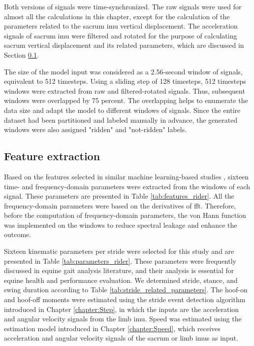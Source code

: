  Both versions of signals were time-synchronized. The raw signals were used for almost all the calculations in this chapter, except for the calculation of the parameters related to the sacrum \gls{imu} vertical displacement. The acceleration signals of sacrum \gls{imu} were filtered and rotated for the purpose of calculating sacrum vertical displacement and its related parameters, which are discussed in Section \ref{sec:Extraction of kinematic parameters}. 
	
The size of the model input was considered as a 2.56-second window of signals, equivalent to 512 timesteps. Using a sliding step of 128 timesteps, 512 timesteps windows were extracted from raw and filtered-rotated signals. Thus, subsequent windows were overlapped by 75 percent. The overlapping helps to enumerate the data size and adapt the model to different windows of signals. Since the entire dataset had been partitioned and labeled manually in advance, the generated windows were also assigned "ridden" and "not-ridden" labels.
	
\subsection{Feature extraction}
\label{sec:Extraction of kinematic parameters}

Based on the features selected in similar machine learning-based studies \cite{ahmed_2020_enhanced,barwick_2018_predicting,rehman_2019_selecting,kamminga_2018_robust}, sixteen time- and frequency-domain parameters were extracted from the windows of each signal. These parameters are presented in Table \ref{tab:features_rider}. All the frequency-domain parameters were based on the derivatives of \gls{fft}. Therefore, before the computation of frequency-domain parameters, the von Hann function was implemented on the windows to reduce spectral leakage and enhance the outcome.




Sixteen kinematic parameters per stride were selected for this study and are presented in Table \ref{tab:parameters_rider}. These parameters were frequently discussed in equine gait analysis literature, and their analysis is essential for equine health and performance evaluation. We determined stride, stance, and swing duration according to Table \ref{tab:stride_related_parameters}. The hoof-on and hoof-off moments were estimated using the stride event detection algorithm introduced in Chapter \ref{chapter:Step},  in which the inputs are the acceleration and angular velocity signals from the
limb \gls{imu}. Speed was estimated using the estimation model introduced in Chapter \ref{chapter:Speed}, which receives acceleration and angular velocity signals of the sacrum or limb \gls{imu}s as input. 

